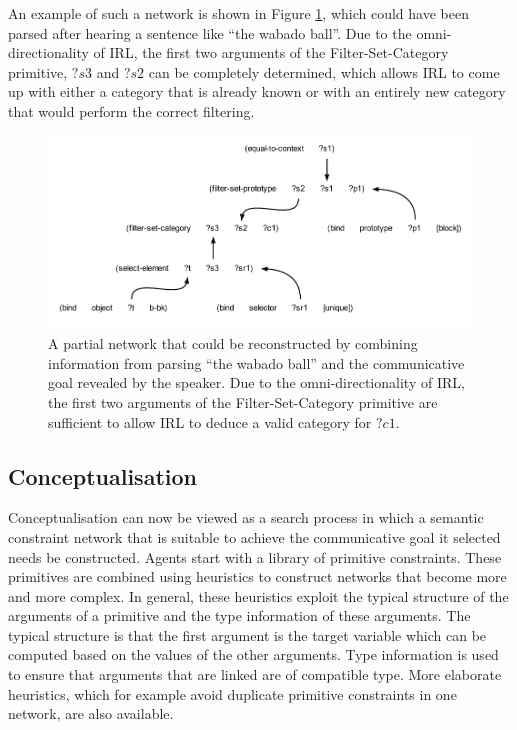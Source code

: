 An example of such a network is shown in Figure
\ref{f:network-learning}, which could have been parsed after hearing a
sentence like ``the wabado ball''. Due to the omni-directionality of
IRL, the first two arguments of the {\sc Filter-Set-Category}
primitive, $?s3$ and $?s2$ can be completely determined, which allows
IRL to come up with either a category that is already known or with an
entirely new category that would perform the correct filtering.

\begin{figure}[htbp]
  \begin{center}
    \includegraphics[width=\textwidth]{./frameworks/figures/network-learning.pdf}
    \caption[Example constraint network during learning]{A partial
      network that could be reconstructed by combining information
      from parsing ``the wabado ball'' and the communicative goal
      revealed by the speaker. Due to the omni-directionality of IRL,
      the first two arguments of the {\sc Filter-Set-Category}
      primitive are sufficient to allow IRL to deduce a valid category
      for $?c1$.}
    \label{f:network-learning}
  \end{center}
\end{figure}

\subsection{Conceptualisation}
\label{s:irl-conceptualisation}

Conceptualisation can now be viewed as a search process in which a
semantic constraint network that is suitable to achieve the
communicative goal it selected \citep{steels05planning} needs be
constructed. Agents start with a library of primitive
constraints. These primitives are combined using heuristics to
construct networks that become more and more complex. In general,
these heuristics exploit the typical structure of the arguments of a
primitive and the type information of these arguments. The typical
structure is that the first argument is the target variable which can
be computed based on the values of the other arguments. Type
information is used to ensure that arguments that are linked are of
compatible type. More elaborate heuristics, which for example avoid
duplicate primitive constraints in one network, are also available.


